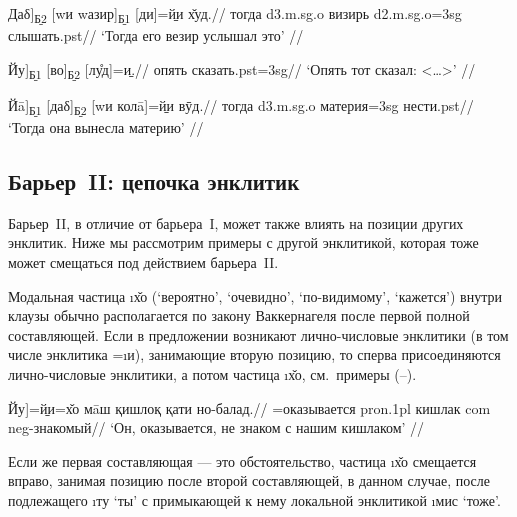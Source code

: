 \begingl
\gla {[}Даδ{]}\textsubscript{\b{Б2}} {[}wи wазир{]}\textsubscript{\b{Б1}} {[}ди{]}=\b{йи} х̌уд.//
\glc тогда {\sc d3.m.sg.o} визирь {\sc d2.m.sg.o=3sg} слышать.{\sc pst}//
\glft ‘Тогда его везир услышал это’ //
\endgl \xe

\begingl
\gla {[}Йу{]}\textsubscript{\b{Б1}} {[}во{]}\textsubscript{\b{Б2}} {[}лу̊д{]}=\b{и}.//
 опять сказать.{\sc pst=3sg}//
\glft ‘Опять тот сказал: <…>’ //
\endgl \xe

\begingl
\gla {[}Йā{]}\textsubscript{\b{Б1}} {[}даδ{]}\textsubscript{\b{Б2}} {[}wи колā{]}=\b{йи} вӯд.//
 тогда {\sc d3.m.sg.o} материя={\sc 3sg} нести.{\sc pst}//
\glft ‘Тогда она вынесла материю’ //
\endgl \xe

\subsection{Барьер~II: цепочка энклитик} \label{clit-bartwo-chain}

Барьер~II, в отличие от барьера~I, может также влиять на позиции других энклитик. Ниже мы рассмотрим примеры с другой энклитикой, которая тоже может смещаться под действием барьера~II.

Модальная частица \i{х̌о} (‘вероятно’, ‘очевидно’, ‘по-видимому’, ‘кажется’) внутри клаузы обычно располагается по закону Ваккернагеля после первой полной составляющей. Если в предложении возникают лично-числовые энклитики (в том числе энклитика =\i{и}), занимающие вторую позицию, то сперва присоединяются лично-числовые энклитики, а потом частица \i{х̌о}, см.~примеры (–).

\begingl
\gla {[}Йу{]}=\b{йи=х̌о} мāш қишлоқ қати но-балад.//
=оказывается {\sc pron.1pl} кишлак {\sc com} {\sc neg}-знакомый//
\glft ‘Он, оказывается, не знаком с нашим кишлаком’ \trailingcitation{[элицитация]}//
\endgl \xe

Если же первая составляющая — это обстоятельство, частица \i{х̌о} смещается вправо, занимая позицию после второй составляющей, в данном случае, после подлежащего \i{ту} ‘ты’ с примыкающей к нему локальной энклитикой \i{мис} ‘тоже’.

